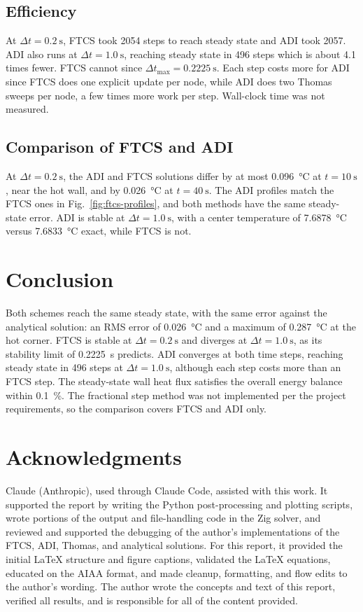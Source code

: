 \documentclass[conf]{new-aiaa}
\begin{document}
\subsection{Efficiency}
At $\Delta t = \SI{0.2}{\second}$, FTCS took 2054 steps to reach steady state and ADI took 2057. ADI also runs at
$\Delta t = \SI{1.0}{\second}$, reaching steady state in 496 steps which is about 4.1 times fewer. FTCS cannot since
$\Delta t_{\max} = \SI{0.2225}{\second}$. Each step costs more for ADI since FTCS does one explicit update per node, while ADI
does two Thomas sweeps per node, a few times more work per step. Wall-clock time was not measured.

\FloatBarrier
\subsection{Comparison of FTCS and ADI}
At $\Delta t = \SI{0.2}{\second}$, the ADI and FTCS solutions differ by at most \SI{0.096}{\degreeCelsius} at
$t = \SI{10}{\second}$, near the hot wall, and by \SI{0.026}{\degreeCelsius} at $t = \SI{40}{\second}$. The ADI profiles
match the FTCS ones in Fig.~\ref{fig:ftcs-profiles}, and both methods have the same steady-state error. ADI is stable at
$\Delta t = \SI{1.0}{\second}$, with a center temperature of \SI{7.6878}{\degreeCelsius} versus \SI{7.6833}{\degreeCelsius}
exact, while FTCS is not.

\FloatBarrier
\section{Conclusion}
Both schemes reach the same steady state, with the same error against the analytical solution: an RMS error of
\SI{0.026}{\degreeCelsius} and a maximum of \SI{0.287}{\degreeCelsius} at the hot corner. FTCS is stable at
$\Delta t = \SI{0.2}{\second}$ and diverges at $\Delta t = \SI{1.0}{\second}$, as its stability limit of
\SI{0.2225}{\second} predicts. ADI converges at both time steps, reaching steady state in 496 steps at
$\Delta t = \SI{1.0}{\second}$, although each step costs more than an FTCS step. The steady-state wall heat flux
satisfies the overall energy balance within \SI{0.1}{\percent}. The fractional step method was not implemented per the project requirements, so
the comparison covers FTCS and ADI only.

\section*{Acknowledgments}
Claude (Anthropic), used through Claude Code, assisted with this work. It supported the report by writing the Python
post-processing and plotting scripts, wrote portions of the output and file-handling code in the Zig solver,
and reviewed and supported the debugging of the author's implementations of the FTCS, ADI, Thomas, and analytical
solutions. For this report, it provided the initial \LaTeX{} structure and figure captions, validated the \LaTeX{}
equations, educated on the AIAA format, and made cleanup, formatting, and flow edits to the author's wording.
The author wrote the concepts and text of this report, verified all results, and is responsible for all of the
content provided.


\end{document}
